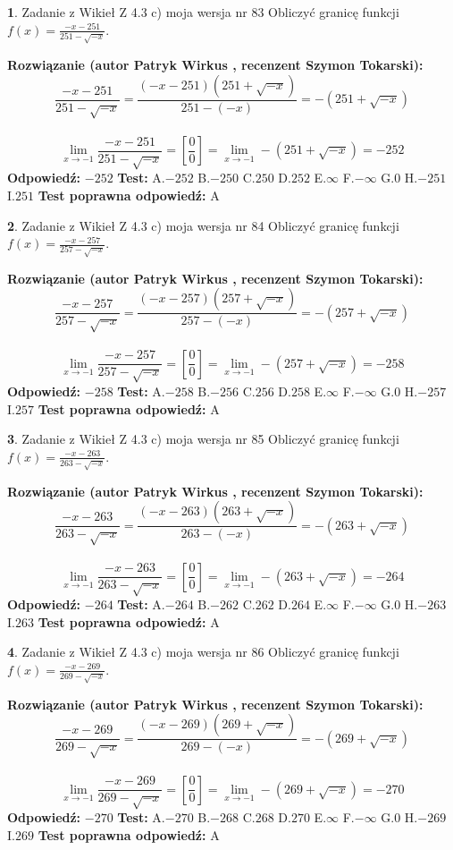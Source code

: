 \documentclass[12pt, a4paper]{article}
\theoremstyle{definition} %
\newtheorem{zad}{}
\newcommand{\zadStart}[1]{\begin{zad}#1\newline}
\newcommand{\zadStop}{\end{zad}}
\newcommand{\rozwStart}[2]{\noindent \textbf{Rozwiązanie (autor #1 , recenzent #2): }\newline}
\newcommand{\rozwStop}{\newline}
\newcommand{\odpStart}{\noindent \textbf{Odpowiedź:}\newline}
\newcommand{\odpStop}{\newline}
\newcommand{\testStart}{\noindent \textbf{Test:}\newline}
\newcommand{\testStop}{\newline}
\newcommand{\kluczStart}{\noindent \textbf{Test poprawna odpowiedź:}\newline}
\newcommand{\kluczStop}{\newline}
\begin{document}
\zadStart{Zadanie z Wikieł Z 4.3 c) moja wersja nr 83}
Obliczyć granicę funkcji $f(x)=\frac{-x-251}{251-\sqrt{-x}}$.
\zadStop
\rozwStart{Patryk Wirkus}{Szymon Tokarski}
$$\frac{-x-251}{251-\sqrt{-x}}=\frac{(-x-251)(251+\sqrt{-x})}{251-(-x)}=-(251+\sqrt{-x})$$
\\
$$\lim\limits_{x\to-1}\frac{-x-251}{251-\sqrt{-x}}=[\frac{0}{0}]=\lim\limits_{x\to-1}-(251+\sqrt{-x}) =-252$$
\rozwStop
\odpStart
$-252$
\odpStop
\testStart
A.$-252$
B.$-250$
C.$250$
D.$252$
E.$\infty$
F.$-\infty$
G.$0$
H.$-251$
I.$251$
\testStop
\kluczStart
A
\kluczStop



\zadStart{Zadanie z Wikieł Z 4.3 c) moja wersja nr 84}
Obliczyć granicę funkcji $f(x)=\frac{-x-257}{257-\sqrt{-x}}$.
\zadStop
\rozwStart{Patryk Wirkus}{Szymon Tokarski}
$$\frac{-x-257}{257-\sqrt{-x}}=\frac{(-x-257)(257+\sqrt{-x})}{257-(-x)}=-(257+\sqrt{-x})$$
\\
$$\lim\limits_{x\to-1}\frac{-x-257}{257-\sqrt{-x}}=[\frac{0}{0}]=\lim\limits_{x\to-1}-(257+\sqrt{-x}) =-258$$
\rozwStop
\odpStart
$-258$
\odpStop
\testStart
A.$-258$
B.$-256$
C.$256$
D.$258$
E.$\infty$
F.$-\infty$
G.$0$
H.$-257$
I.$257$
\testStop
\kluczStart
A
\kluczStop



\zadStart{Zadanie z Wikieł Z 4.3 c) moja wersja nr 85}
Obliczyć granicę funkcji $f(x)=\frac{-x-263}{263-\sqrt{-x}}$.
\zadStop
\rozwStart{Patryk Wirkus}{Szymon Tokarski}
$$\frac{-x-263}{263-\sqrt{-x}}=\frac{(-x-263)(263+\sqrt{-x})}{263-(-x)}=-(263+\sqrt{-x})$$
\\
$$\lim\limits_{x\to-1}\frac{-x-263}{263-\sqrt{-x}}=[\frac{0}{0}]=\lim\limits_{x\to-1}-(263+\sqrt{-x}) =-264$$
\rozwStop
\odpStart
$-264$
\odpStop
\testStart
A.$-264$
B.$-262$
C.$262$
D.$264$
E.$\infty$
F.$-\infty$
G.$0$
H.$-263$
I.$263$
\testStop
\kluczStart
A
\kluczStop



\zadStart{Zadanie z Wikieł Z 4.3 c) moja wersja nr 86}
Obliczyć granicę funkcji $f(x)=\frac{-x-269}{269-\sqrt{-x}}$.
\zadStop
\rozwStart{Patryk Wirkus}{Szymon Tokarski}
$$\frac{-x-269}{269-\sqrt{-x}}=\frac{(-x-269)(269+\sqrt{-x})}{269-(-x)}=-(269+\sqrt{-x})$$
\\
$$\lim\limits_{x\to-1}\frac{-x-269}{269-\sqrt{-x}}=[\frac{0}{0}]=\lim\limits_{x\to-1}-(269+\sqrt{-x}) =-270$$
\rozwStop
\odpStart
$-270$
\odpStop
\testStart
A.$-270$
B.$-268$
C.$268$
D.$270$
E.$\infty$
F.$-\infty$
G.$0$
H.$-269$
I.$269$
\testStop
\kluczStart
A
\kluczStop
\end{document}
